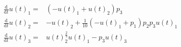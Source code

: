 \begin{align}
\frac{\mathrm{d}}{\mathrm{d}t} u(t)_1 =& \left(  - u(t)_1 + u(t)_2 \right) p_3 \\
\frac{\mathrm{d}}{\mathrm{d}t} u(t)_2 =&  - u(t)_2 + \frac{1}{10} \left(  - u(t)_1 + p_1 \right) p_2 p_3 u(t)_1 \\
\frac{\mathrm{d}}{\mathrm{d}t} u(t)_3 =& u(t)_2^{\frac{2}{3}} u(t)_1 - p_3 u(t)_3
\end{align}
